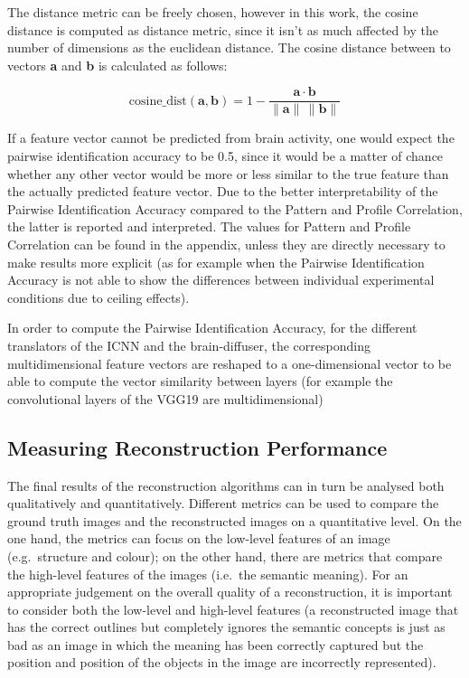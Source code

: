 The distance metric can be freely chosen, however in this work, the cosine distance is computed as distance metric, since it isn't as much affected by the number of dimensions as the euclidean distance. The cosine distance between to vectors \textbf{a} and \textbf{b} is calculated as follows:

\[
\text{cosine\_dist}(\mathbf{a}, \mathbf{b}) = 1 - \frac{\mathbf{a} \cdot \mathbf{b}}{\|\mathbf{a}\| \, \|\mathbf{b}\|}
\]

If a feature vector cannot be predicted from brain activity, one would expect the pairwise identification accuracy to be 0.5, since it would be a matter of chance whether any other vector would be more or less similar to the true feature than the actually predicted feature vector. Due to the better interpretability of the Pairwise Identification Accuracy compared to the Pattern and Profile Correlation, the latter is reported and interpreted. The values for Pattern and Profile Correlation can be found in the appendix, unless they are directly necessary to make results more explicit (as for example when the Pairwise Identification Accuracy is not able to show the differences between individual experimental conditions due to ceiling effects).

In order to compute the Pairwise Identification Accuracy, for the different translators of the ICNN and the brain-diffuser, the corresponding multidimensional feature vectors are reshaped to a one-dimensional vector to be able to compute the vector similarity between layers (for example the convolutional layers of the VGG19 are multidimensional)


\subsection{Measuring Reconstruction Performance}

The final results of the reconstruction algorithms can in turn be analysed both qualitatively and quantitatively. Different metrics can be used to compare the ground truth images and the reconstructed images on a quantitative level\cite{ozcelikNaturalSceneReconstruction2023}. On the one hand, the metrics can focus on the low-level features of an image (e.g.\ structure and colour); on the other hand, there are metrics that compare the high-level features of the images (i.e.\ the semantic meaning). For an appropriate judgement on the overall quality of a reconstruction, it is important to consider both the low-level and high-level features (a reconstructed image that has the correct outlines but completely ignores the semantic concepts is just as bad as an image in which the meaning has been correctly captured but the position and position of the objects in the image are incorrectly represented).

